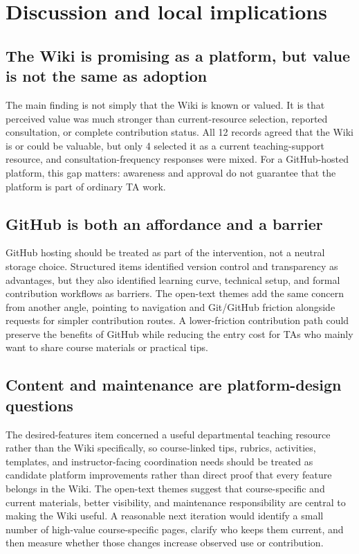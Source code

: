 \documentclass[11pt]{article}
\begin{document}
\section{Discussion and local implications}
\subsection{The Wiki is promising as a platform, but value is not the same as adoption}
The main finding is not simply that the Wiki is known or valued. It is that perceived value was much stronger than current-resource selection, reported consultation, or complete contribution status. All 12 records agreed that the Wiki is or could be valuable, but only 4 selected it as a current teaching-support resource, and consultation-frequency responses were mixed. For a GitHub-hosted platform, this gap matters: awareness and approval do not guarantee that the platform is part of ordinary TA work.

\subsection{GitHub is both an affordance and a barrier}
GitHub hosting should be treated as part of the intervention, not a neutral storage choice. Structured items identified version control and transparency as advantages, but they also identified learning curve, technical setup, and formal contribution workflows as barriers. The open-text themes add the same concern from another angle, pointing to navigation and Git/GitHub friction alongside requests for simpler contribution routes. A lower-friction contribution path could preserve the benefits of GitHub while reducing the entry cost for TAs who mainly want to share course materials or practical tips.

\subsection{Content and maintenance are platform-design questions}
The desired-features item concerned a useful departmental teaching resource rather than the Wiki specifically, so course-linked tips, rubrics, activities, templates, and instructor-facing coordination needs should be treated as candidate platform improvements rather than direct proof that every feature belongs in the Wiki. The open-text themes suggest that course-specific and current materials, better visibility, and maintenance responsibility are central to making the Wiki useful. A reasonable next iteration would identify a small number of high-value course-specific pages, clarify who keeps them current, and then measure whether those changes increase observed use or contribution.
\end{document}
